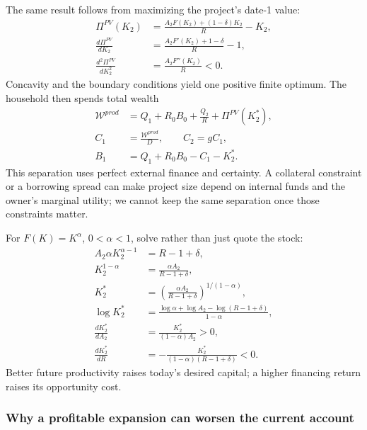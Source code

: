 The same result follows from maximizing the project's date-1 value:
\begin{align}
 \Pi^{PV}(K_2)&=\frac{A_2F(K_2)+(1-\delta)K_2}{R}-K_2,\\
 \frac{d\Pi^{PV}}{dK_2}
 &=\frac{A_2F'(K_2)+1-\delta}{R}-1,\\
 \frac{d^2\Pi^{PV}}{dK_2^2}&=\frac{A_2F''(K_2)}R<0.
\end{align}
Concavity and the boundary conditions yield one positive finite optimum.
The household then spends total wealth
\begin{align}
 \mathcal W^{prod}
 &=Q_1+R_0B_0+\frac{Q_2}{R}+\Pi^{PV}(K_2^*),\\
 C_1&=\frac{\mathcal W^{prod}}D,\qquad C_2=gC_1,\\
 B_1&=Q_1+R_0B_0-C_1-K_2^*.
\end{align}
This separation uses perfect external finance and certainty. A collateral
constraint or a borrowing spread can make project size depend on internal
funds and the owner's marginal utility; we cannot keep the same separation
once those constraints matter.

For $F(K)=K^\alpha$, $0<\alpha<1$, solve rather than just quote the stock:
\begin{align}
 A_2\alpha K_2^{\alpha-1}&=R-1+\delta,\\
 K_2^{1-\alpha}&=\frac{\alpha A_2}{R-1+\delta},\\
 K_2^*&=\left(\frac{\alpha A_2}{R-1+\delta}\right)^{1/(1-\alpha)},\\
 \log K_2^*&=\frac{\log\alpha+\log A_2-\log(R-1+\delta)}{1-\alpha},\\
 \frac{dK_2^*}{dA_2}&=\frac{K_2^*}{(1-\alpha)A_2}>0,\\
 \frac{dK_2^*}{dR}&=-\frac{K_2^*}{(1-\alpha)(R-1+\delta)}<0.
\end{align}
Better future productivity raises today's desired capital; a higher financing
return raises its opportunity cost.

\subsubsection{Why a profitable expansion can worsen the current account}

